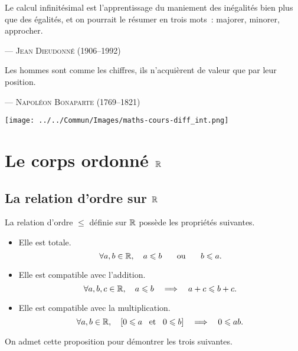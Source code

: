 \documentclass{magnolia}
\begin{document}
\setlength{}
\epigraph{\og Le calcul infinitésimal est l'apprentissage du maniement des inégalités bien plus que des égalités, et on pourrait le résumer en trois mots~: majorer, minorer, approcher.\fg}{--- \textsc{Jean Dieudonné (1906--1992)}}
\setlength{}
\epigraph{\og Les hommes sont comme les chiffres, ils n'acquièrent de valeur que par leur position.\fg}{--- \textsc{Napoléon Bonaparte (1769--1821)}}

\hfill\texttt{[image: ../../Commun/Images/maths-cours-diff\_int.png]}\\
\magtoc

\section{Le corps ordonné $\mathbb{R}$}

\subsection{La relation d'ordre sur $\mathbb{R}$}


\begin{proposition}[utile=-3]
La relation d'ordre $\leq$ définie sur $\mathbb{R}$ possède les propriétés suivantes.
\begin{itemize}
\item Elle est totale.
  \[\forall a,b\in\mathbb{R} ,\quad a\leqslant b \quad\quad\!\text{ou}\quad\!\quad b\leqslant a.\]
\item Elle est compatible avec l'addition.
  \[\forall a,b,c\in\mathbb{R} ,\quad a\leqslant b \quad\Longrightarrow\quad a+c\leqslant b+c.\]
\item Elle est compatible avec la multiplication.
  \[\forall a,b\in\mathbb{R} ,\quad \left[0\leqslant a \quad\!\text{et}\quad\! 0\leqslant b\right] \quad\Longrightarrow\quad 0\leqslant ab.\]
\end{itemize}
\end{proposition}

\begin{preuve}
On admet cette proposition pour démontrer les trois suivantes.
\end{preuve}
\end{document}

